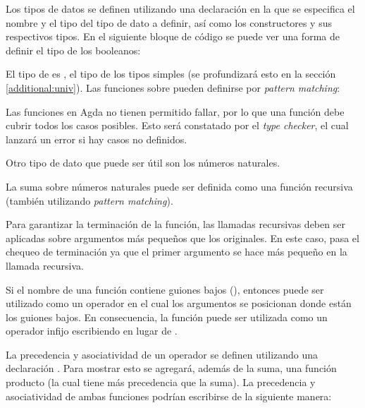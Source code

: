 Los tipos de datos se definen utilizando una declaración  en la que se especifica el nombre y el tipo del tipo de dato a definir, así como los constructores y sus respectivos tipos. En el siguiente bloque de código se puede ver una forma de definir el tipo de los booleanos:


El tipo de  es , el tipo de los tipos simples (se profundizará esto en la sección \ref{additional:univ}). Las funciones sobre  pueden definirse por \textit{pattern matching}:


Las funciones en Agda no tienen permitido fallar, por lo que una función debe cubrir todos los casos posibles. Esto será constatado por el \textit{type checker}, el cual lanzará un error si hay casos no definidos. 

Otro tipo de dato que puede ser útil son los números naturales. 


La suma sobre números naturales puede ser definida como una función recursiva (también utilizando \textit{pattern matching}). 


Para garantizar la terminación de la función, las llamadas recursivas deben ser aplicadas sobre argumentos más pequeños que los originales. En este caso, \AgdaFunction{\_+\_} pasa el chequeo de terminación ya que el primer argumento se hace más pequeño en la llamada recursiva. 

Si el nombre de una función contiene guiones bajos (\AgdaSymbol{\_}), entonces puede ser utilizado como un operador en el cual los argumentos se posicionan donde están los guiones bajos. En consecuencia, la función \AgdaFunction{\_+\_} puede ser utilizada como un operador infijo escribiendo  \AgdaFunction{+}  en lugar de \AgdaFunction{\_+\_} . 

La precedencia y asociatividad de un operador se definen utilizando una declaración . Para mostrar esto se agregará, además de la suma, una función producto (la cual tiene más precedencia que la suma). La precedencia y asociatividad de ambas funciones podrían escribirse de la siguiente manera:


